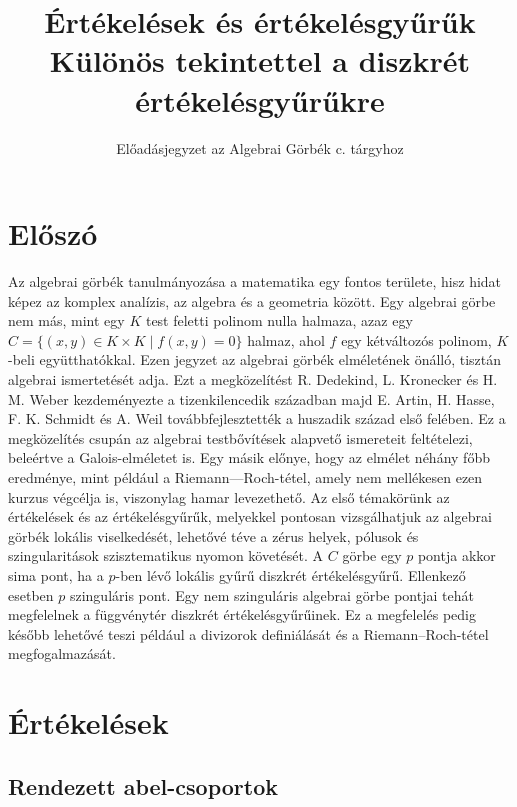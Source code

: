 \documentclass[11pt,a4paper]{article}
\title{%
Értékelések és értékelésgyűrűk\\
\large Különös tekintettel a diszkrét értékelésgyűrűkre
}
\author{Előadásjegyzet az Algebrai Görbék c. tárgyhoz}
\date{}
\theoremstyle{definition}
\theoremstyle{plain}
\begin{document}
\maketitle

\tableofcontents

\bigskip

{\section*{Előszó}
Az algebrai görbék tanulmányozása a matematika egy fontos területe, hisz hidat képez az komplex analízis, az algebra és a geometria között. Egy algebrai görbe nem más, mint egy $K$ test feletti polinom nulla halmaza, azaz egy $C = \{(x,y) \in K \times K \mid f(x,y) = 0\}$ halmaz, ahol $f$ egy
kétváltozós polinom, $K$-beli együtthatókkal.
\newline\indent Ezen jegyzet az algebrai görbék elméletének önálló, tisztán algebrai ismertetését adja. Ezt a megközelítést R. Dedekind,
L. Kronecker és H. M. Weber kezdeményezte a tizenkilencedik században majd E. Artin, H. Hasse, F. K. Schmidt és A. Weil továbbfejlesztették 
a huszadik század első felében. Ez a megközelítés csupán az algebrai testbővítések alapvető ismereteit feltételezi, beleértve a Galois-elméletet is. Egy másik előnye, hogy
az elmélet néhány főbb eredménye, mint például a Riemann—Roch-tétel, amely nem mellékesen ezen kurzus végcélja is, viszonylag hamar levezethető. 
\newline\indent Az első témakörünk az értékelések és az értékelésgyűrűk, melyekkel pontosan vizsgálhatjuk az algebrai görbék lokális viselkedését, lehetővé téve a zérus helyek, pólusok és szingularitások szisztematikus nyomon követését. A $C$ görbe egy $p$ pontja akkor sima pont, ha a $p$-ben lévő lokális gyűrű diszkrét értékelésgyűrű. Ellenkező esetben
$p$ szinguláris pont. %
Egy nem szinguláris algebrai görbe pontjai tehát megfelelnek a függvénytér diszkrét értékelésgyűrűinek. Ez a megfelelés pedig később lehetővé teszi például a divizorok definiálását és a Riemann–Roch-tétel megfogalmazását.


\section{Értékelések}

\subsection{Rendezett abel-csoportok}

}
\end{document}
